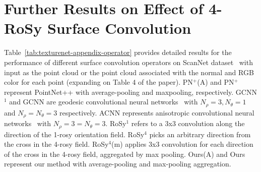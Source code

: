 \section{Further Results on Effect of 4-RoSy Surface Convolution}
\label{appendix:4rosy}
Table~\ref{tab:texturenet-appendix-operator} provides detailed results for the performance of different surface convolution operators on ScanNet dataset~\cite{dai2017scannet} with input as the point cloud or the point cloud associated with the normal and RGB color for each point (expanding on Table 4 of the paper).    
PN$^+$(A) and PN$^+$ represent PointNet++ with average-pooling and maxpooling, respectively. GCNN$^1$ and GCNN are geodesic convolutional neural networks~\cite{masci2015geodesic} with $N_\rho=3,N_\theta=1$ and $N_\rho=N_\theta=3$ respectively. 
ACNN represents anisotropic convolutional neural networks~\cite{boscaini2016learning} with $N_\rho=3=N_\theta=3$. RoSy$^1$ refers to a 3x3 convolution along the direction of the 1-rosy orientation field. 
RoSy$^4$ picks an arbitrary direction from the cross in the 4-rosy field. RoSy$^4$(m) applies 3x3 convolution for each direction of the cross in the 4-rosy field, aggregated by max pooling. 
Ours(A) and Ours represent our method with average-pooling and max-pooling aggregation.
